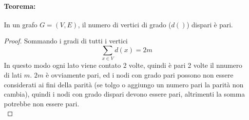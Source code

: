 \documentclass[11pt]{article}
\begin{document}
	\paragraph{Teorema:} In un grafo $G=(V,E)$, il numero di vertici di grado ($d()$) dispari è pari.\\
	
	\begin{proof}
		Sommando i gradi di tutti i vertici
		$$ \sum_{x \in V} d(x) = 2m $$
		In questo modo ogni lato viene contato 2 volte, quindi è pari 2 volte il nnumero di lati $m$. $2m$ è ovviamente pari, ed i nodi con grado pari possono non essere considerati ai fini della parità (se tolgo o aggiungo un numero pari la parità non cambia), quindi i nodi con grado dispari devono essere pari, altrimenti la somma potrebbe non essere pari.\\
	\end{proof}
	
	
	
	
\end{document}
